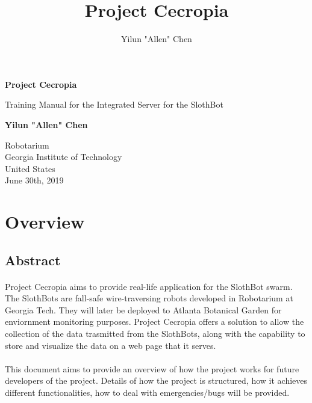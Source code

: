 \documentclass{article}
\begin{document}
	\title{Project Cecropia}
	\author{Yilun "Allen" Chen}
  	\newpage
\begin{titlepage}
  \begin{center}
      \vspace*{8cm}

      \textbf{Project Cecropia}

      \vspace{0.5cm}
       Training Manual for the Integrated Server for the SlothBot 

      \vspace{1.5cm}

      \textbf{Yilun "Allen" Chen}

      \vfill


      Robotarium\\
      Georgia Institute of Technology\\
      United States\\
      June 30th, 2019

  \end{center}
\end{titlepage}

\tableofcontents
\newpage

\section{Overview}
\subsection{Abstract}
\paragraph{} Project Cecropia aims to provide real-life application for the SlothBot swarm. The SlothBots are fall-safe
wire-traversing robots developed in Robotarium at Georgia Tech. They will later be deployed to Atlanta Botanical Garden for enviornment monitoring
purposes. Project Cecropia offers a solution to allow the collection of the data trasmitted from the SlothBots, along with the capability to store
and visualize the data on a web page that it serves.
\paragraph{}This document aims to provide an overview of how the project works for future developers of the project. Details of how the project is structured, 
how it achieves different functionalities, how to deal with emergencies/bugs will be provided.
\end{document}
